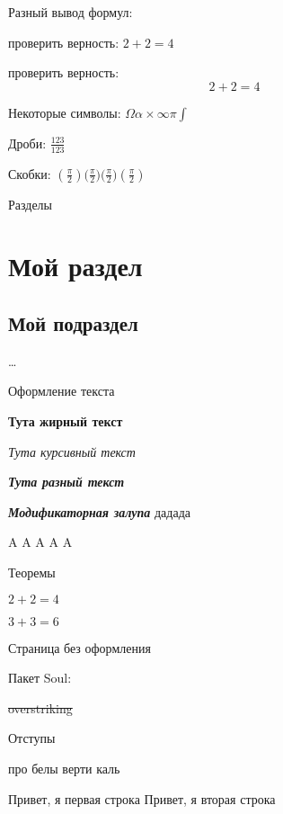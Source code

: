 


	Разный вывод формул:
	
	проверить верность: $2+2=4$
	
	проверить верность: \[2+2=4\]
	
	Некоторые символы: $\Omega \alpha \times \infty \pi \int$
	
	Дроби: $\frac{123}{123}$
	
	Скобки: $(\frac{\pi}{2}) \big(\frac{\pi}{2}\big) \bigg(\frac{\pi}{2}\bigg)  \left( \frac{\pi}{2}\right) $
	
	
	Разделы
	
	
	\section{Мой раздел}
	
	\subsection{Мой подраздел}
	
	\dots
	
	
	Оформление текста
	
	\textbf{Тута жирный текст}
	
	\textit{Тута курсивный текст}
	
	\textbf{\textit{Тута разный текст}}
	
	{\bfseries \itshape \Large Модификаторная залупа} дадада
	
	\Huge A \LARGE A \large A \normalsize A \small A
	
	
	
	Теоремы
	
	\begin{theorem}
		$2+2=4$
	\end{theorem}
	
	\begin{theorem}
		$3+3=6$
	\end{theorem}
	
	Страница без оформления
	\thispagestyle{empty}
	
	
	Пакет Soul:
	
	\st{overstriking} 
	
	
	Отступы
	
	про \hspace{2cm} белы
	верти \vspace{2cm} каль
	
	Привет, я первая строка \linebreak
	Привет, я вторая строка
	
	
	
